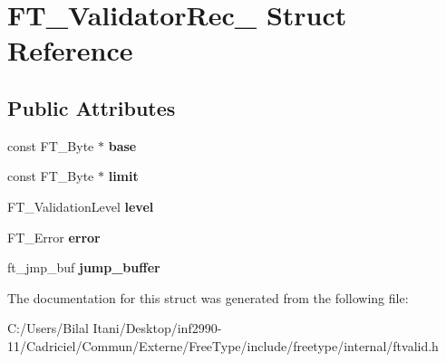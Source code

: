 \hypertarget{struct_f_t___validator_rec__}{}\section{F\+T\+\_\+\+Validator\+Rec\+\_\+ Struct Reference}
\label{struct_f_t___validator_rec__}
\subsection*{Public Attributes}
\begin{DoxyCompactItemize}
\item 
const F\+T\+\_\+\+Byte $\ast$ {\bfseries base}\hypertarget{struct_f_t___validator_rec___a62de459b75acae3e1695b3d6600ca22f}{}\label{struct_f_t___validator_rec___a62de459b75acae3e1695b3d6600ca22f}

\item 
const F\+T\+\_\+\+Byte $\ast$ {\bfseries limit}\hypertarget{struct_f_t___validator_rec___acc4d58a3e46d2b7c92bb51c3ddd8d331}{}\label{struct_f_t___validator_rec___acc4d58a3e46d2b7c92bb51c3ddd8d331}

\item 
F\+T\+\_\+\+Validation\+Level {\bfseries level}\hypertarget{struct_f_t___validator_rec___aa70830280c76507b8b06e616da8cb545}{}\label{struct_f_t___validator_rec___aa70830280c76507b8b06e616da8cb545}

\item 
F\+T\+\_\+\+Error {\bfseries error}\hypertarget{struct_f_t___validator_rec___ab12d54f54a55a90ce19761a1c24e28f0}{}\label{struct_f_t___validator_rec___ab12d54f54a55a90ce19761a1c24e28f0}

\item 
ft\+\_\+jmp\+\_\+buf {\bfseries jump\+\_\+buffer}\hypertarget{struct_f_t___validator_rec___aa0b346f9ef78939e93c85389aa2b54b3}{}\label{struct_f_t___validator_rec___aa0b346f9ef78939e93c85389aa2b54b3}

\end{DoxyCompactItemize}


The documentation for this struct was generated from the following file\+:\begin{DoxyCompactItemize}
\item 
C\+:/\+Users/\+Bilal Itani/\+Desktop/inf2990-\/11/\+Cadriciel/\+Commun/\+Externe/\+Free\+Type/include/freetype/internal/ftvalid.\+h\end{DoxyCompactItemize}
